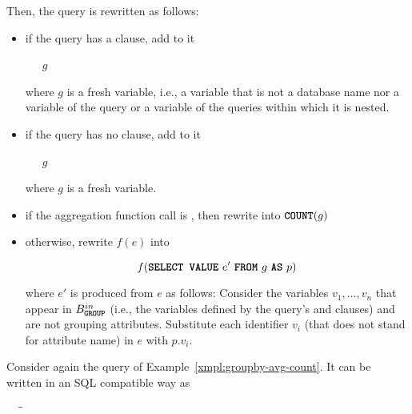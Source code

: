 Then, the query is rewritten as follows:
\begin{itemize}
\item if the query has a  clause, add to it 
\begin{tabbing}
\ \ \ $g$
\end{tabbing}

\noindent where $g$ is a fresh variable, i.e., a variable that is not a database
name nor a variable of the query or a variable of the queries within which it is
nested.

\item if the query has no  clause, add to it 
\begin{tabbing}
\ \ \ $g$
\end{tabbing}
\noindent where $g$ is a fresh variable.

\item if the aggregation function call is , then rewrite into
$\texttt{\textbf{COUNT}}(g)$

\item otherwise, rewrite $f(e)$ into 

\[ f(\gl{SELECT VALUE}\ e'\ \gl{FROM}\ g\ \gl{AS}\ p) \]

\noindent where $e'$ is produced from $e$ as follows: Consider the variables
$v_1, \ldots, v_n$  that appear in $B^{in}_{\texttt{\textbf{GROUP}}}$ (i.e., the variables
defined by the query's  and  clauses) and are not grouping
attributes. Substitute each identifier $v_i$ (that does not stand for attribute
name) in $e$ with $p.v_i$.
\end{itemize}



\begin{example}
\label{xmpl:groupby-sql}

Consider again the query of Example~\ref{xmpl:groupby-avg-count}. It can be
written in an SQL compatible way as

\begin{tabbing}
\ \ \ \=\=\\
\>\>\\
\>\>\\
\>\\
\>
\end{tabbing}
\end{example}

